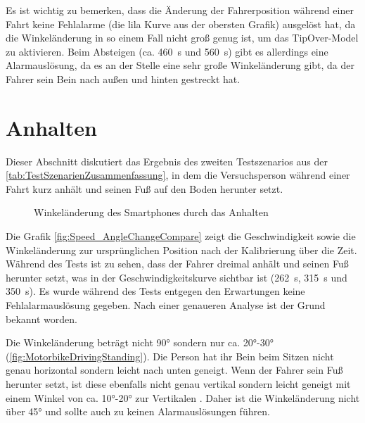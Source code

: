 

Es ist wichtig zu bemerken, dass die Änderung der Fahrerposition während einer Fahrt keine Fehlalarme (die lila Kurve aus der obersten Grafik) ausgelöst hat, da die Winkeländerung in so einem Fall nicht groß genug ist, um das \glqq TipOver\grqq{}-Model zu aktivieren. Beim Absteigen (ca. \SI{460}{\second} und \SI{560}{\second}) gibt es allerdings eine Alarmauslösung, da es an der Stelle eine sehr große Winkeländerung gibt, da der Fahrer sein Bein nach außen und hinten gestreckt hat.
\section{Anhalten}
Dieser Abschnitt diskutiert das Ergebnis des zweiten Testszenarios aus der \autoref{tab:TestSzenarienZusammenfassung}, in dem die Versuchsperson während einer Fahrt kurz anhält und seinen Fuß auf den Boden herunter setzt.

\begin{figure}[htpb]
	\centering
	\caption{Winkeländerung des Smartphones durch das Anhalten}
	\label{fig:Speed_AngleChangeCompare}
\end{figure}
Die Grafik \autoref{fig:Speed_AngleChangeCompare} zeigt die Geschwindigkeit sowie die Winkeländerung zur ursprünglichen Position nach der Kalibrierung über die Zeit.
Während des Tests ist zu sehen, dass der Fahrer dreimal anhält und seinen Fuß herunter setzt, was in der Geschwindigkeitskurve sichtbar ist (\SI{262}{\second}, \SI{315}{\second} und \SI{350}{\second}). Es wurde während des Tests entgegen den Erwartungen keine Fehlalarmauslösung gegeben. Nach einer genaueren Analyse ist der Grund bekannt worden.

Die Winkeländerung beträgt nicht \ang{90} sondern nur ca. \ang{20}-\ang{30} (\autoref{fig:MotorbikeDrivingStanding}). Die Person hat ihr Bein beim Sitzen nicht genau horizontal sondern leicht nach unten geneigt. Wenn der Fahrer sein Fuß herunter setzt, ist diese ebenfalls nicht genau vertikal sondern leicht geneigt mit einem Winkel von ca. \ang{10}-\ang{20} zur Vertikalen . Daher ist die Winkeländerung nicht über \ang{45} und sollte auch zu keinen Alarmauslösungen führen.

